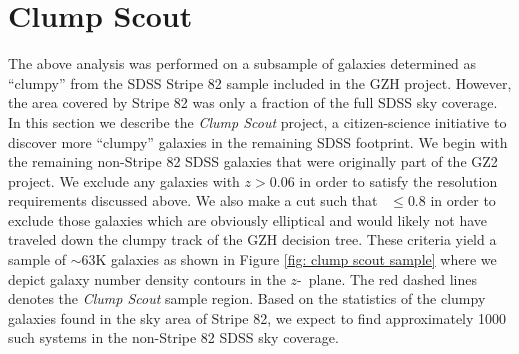 


\section{Clump Scout}
\label{chap5: Clump Scout}

The above analysis was performed on a subsample of galaxies determined as ``clumpy'' from the SDSS Stripe 82 sample included in the GZH project. However, the area covered by Stripe 82 was only a fraction of the full SDSS sky coverage. In this section we describe the \textit{Clump Scout} project, a citizen-science initiative to discover more ``clumpy'' galaxies in the remaining SDSS footprint. We begin with the remaining non-Stripe 82 SDSS galaxies that were originally part of the GZ2 project. We exclude any galaxies with $z>0.06$ in order to satisfy the resolution requirements discussed above. We also make a cut such that \fsmooth~$\le0.8$ in order to exclude those galaxies which are obviously elliptical and would likely not have traveled down the clumpy track of the GZH decision tree. These criteria yield a sample of $\sim63$K galaxies as shown in Figure \ref{fig: clump scout sample} where we depict galaxy number density contours in the $z$-\fsmooth~plane. The red dashed lines denotes the \textit{Clump Scout} sample region. Based on the statistics of the clumpy galaxies found in the sky area of Stripe 82, we expect to find approximately 1000 such systems in the non-Stripe 82 SDSS sky coverage.


